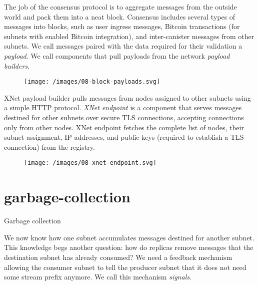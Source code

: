 \documentclass{article}
\begin{document}
The job of the consensus protocol is to aggregate messages from the outside world and pack them into a neat block.
Consensus includes several types of messages into blocks, such as user ingress messages, Bitcoin transactions (for subnets with enabled Bitcoin integration), and inter-canister messages from other subnets.
We call messages paired with the data required for their validation a \emph{payload}.
We call components that pull payloads from the network \emph{payload builders}.

\begin{figure}[grayscale-diagram]
  \texttt{[image: /images/08-block-payloads.svg]}
\end{figure}

XNet payload builder pulls messages from nodes assigned to other subnets using a simple HTTP protocol.
\emph{XNet endpoint} is a component that serves messages destined for other subnets over secure TLS connections, accepting connections only from other nodes.
XNet endpoint fetches the complete list of nodes, their subnet assignment, IP addresses, and public keys (required to establish a TLS connection) from the registry.

\begin{figure}[grayscale-diagram]
  \texttt{[image: /images/08-xnet-endpoint.svg]}
\end{figure}

\section{garbage-collection}{Garbage collection}

We now know how one subnet accumulates messages destined for another subnet.
This knowledge begs another question: how do replicas remove messages that the destination subnet has already consumed?
We need a feedback mechanism allowing the consumer subnet to tell the producer subnet that it does not need some stream prefix anymore.
We call this mechanism \emph{signals}.
\end{document}
